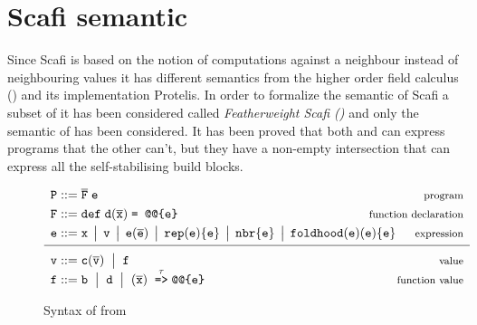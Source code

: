\section{Scafi semantic}

Since Scafi is based on the notion of computations against a neighbour instead of neighbouring values it has different semantics from the higher order field calculus (\HFC) and its implementation Protelis. In order to formalize the semantic of Scafi a subset of it has been considered called \textit{Featherweight Scafi (\FSCAFI)} \cite{Scafi} and only the semantic of \FSCAFI has been considered. It has been proved that both \FSCAFI and \HFC{} can express programs that the other can't, but they have a non-empty intersection that can express all the self-stabilising build blocks.

\begin{figure}[t]
\centering
\centerline{$
\begin{array}{l@{\hspace{1mm}}c@{\hspace{1mm}}l@{\hspace{-8mm}}r}
        \PROGRAM & \BNFcce & \overline{\FUNCTION}  \; \e
                                                                                                                                                                                                        &   {\footnotesize \mbox{program}} \\[3pt]
        \FUNCTION & \BNFcce &  \defK \; \fname (\overline{\xname}) \; \eqSymK{\e}
                                                                                                                                                                                                        &   {\footnotesize \mbox{function declaration}} \\[3pt]
        \e & \BNFcce & \xname \, \BNFmid \, \anyvalue \, \BNFmid \, \e(\overline{\e}) \, \BNFmid \, \repK(\e)\{ \e \} \, \BNFmid \, \nbrK\{\e\} \, \BNFmid \, \foldK(\e)(\e)\{\e\} \,
                                                                                                                                                                                                        &   {\footnotesize \mbox{expression}} \\[3pt]
        \hline \\[-6pt]
        \anyvalue & \BNFcce &  {\dc(\overline{\anyvalue})} \; \BNFmid \; \funvalue
                                                                                                                                                                                                        &   {\footnotesize\mbox{value}} \\
        \funvalue & \BNFcce & \bname \; \BNFmid \; \fname \; \BNFmid \; (\overline{\xname}) \; \toSymKtag{\name}{\e}
                                                                                                                                                                                                        &   {\footnotesize\mbox{function value}} \\
\end{array}
$
}
\caption{Syntax of \FSCAFI{} from \cite{Scafi}}
\label{fig:fscafisyntax}
\end{figure}

